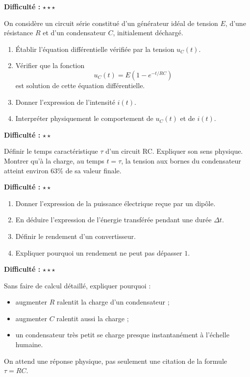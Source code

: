 \documentclass[11pt,a4paper]{article}
\newcommand{\etoiles}[1]{\textbf{Difficulté :} #1}
\begin{document}
\begin{exercisebox}
\etoiles{\(\star\star\star\)}

On considère un circuit série constitué d'un générateur idéal de tension \(E\), d'une résistance \(R\) et d'un condensateur \(C\), initialement déchargé.

\begin{enumerate}[label=\alph*)]
    \item Établir l'équation différentielle vérifiée par la tension \(u_C(t)\).
    \item Vérifier que la fonction
    \[
    u_C(t)=E\left(1-e^{-t/RC}\right)
    \]
    est solution de cette équation différentielle.
    \item Donner l'expression de l'intensité \(i(t)\).
    \item Interpréter physiquement le comportement de \(u_C(t)\) et de \(i(t)\).
\end{enumerate}
\end{exercisebox}

\begin{exercisebox}
\etoiles{\(\star\star\)}

Définir le temps caractéristique \(\tau\) d'un circuit RC. Expliquer son sens physique. Montrer qu'à la charge, au temps \(t=\tau\), la tension aux bornes du condensateur atteint environ \(63\%\) de sa valeur finale.
\end{exercisebox}

\begin{exercisebox}
\etoiles{\(\star\star\)}

\begin{enumerate}[label=\alph*)]
    \item Donner l'expression de la puissance électrique reçue par un dipôle.
    \item En déduire l'expression de l'énergie transférée pendant une durée \(\Delta t\).
    \item Définir le rendement d'un convertisseur.
    \item Expliquer pourquoi un rendement ne peut pas dépasser \(1\).
\end{enumerate}
\end{exercisebox}

\begin{exercisebox}
\etoiles{\(\star\star\star\)}

Sans faire de calcul détaillé, expliquer pourquoi :
\begin{itemize}
    \item augmenter \(R\) ralentit la charge d'un condensateur ;
    \item augmenter \(C\) ralentit aussi la charge ;
    \item un condensateur très petit se charge presque instantanément à l'échelle humaine.
\end{itemize}
On attend une réponse physique, pas seulement une citation de la formule \(\tau=RC\).
\end{exercisebox}
\end{document}
